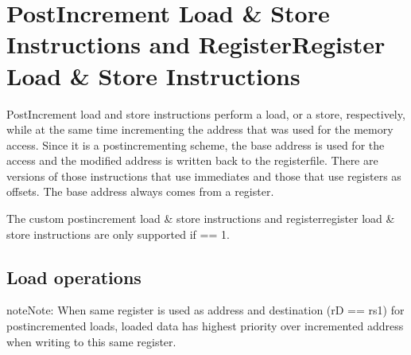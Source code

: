 \documentclass[letterpaper,10pt,english]{sphinxmanual}
\begin{document}
\section{Post\sphinxhyphen{}Increment Load \& Store Instructions and Register\sphinxhyphen{}Register Load \& Store Instructions}
\label{\detokenize{instruction_set_extensions:post-increment-load-store-instructions-and-register-register-load-store-instructions}}\label{\detokenize{instruction_set_extensions:corev-load-store}}
\sphinxAtStartPar
Post\sphinxhyphen{}Increment load and store instructions perform a load, or a
store, respectively, while at the same time incrementing the address
that was used for the memory access. Since it is a post\sphinxhyphen{}incrementing
scheme, the base address is used for the access and the modified address
is written back to the register\sphinxhyphen{}file. There are versions of those
instructions that use immediates and those that use registers as
offsets. The base address always comes from a register.

\sphinxAtStartPar
The custom post\sphinxhyphen{}increment load \& store instructions and register\sphinxhyphen{}register
load \& store instructions are only supported if  == 1.


\subsection{Load operations}
\label{\detokenize{instruction_set_extensions:load-operations}}
\begin{sphinxadmonition}{note}{Note:}
\sphinxAtStartPar
When same register is used as address and destination (rD == rs1) for post\sphinxhyphen{}incremented loads,
loaded data has highest priority over incremented address when writing to this same register.
\end{sphinxadmonition}
\end{document}
